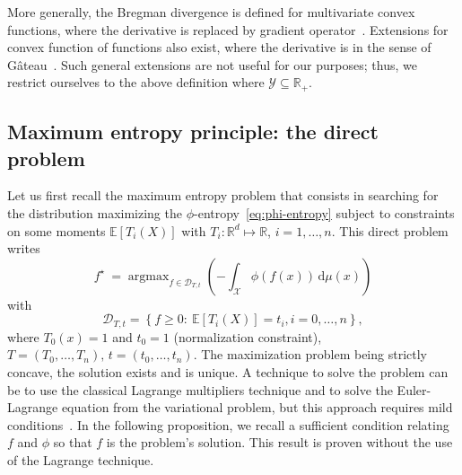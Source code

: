 \documentclass[entropy,article,submit,moreauthors,pdftex]{Definitions/mdpi}
\def\dmu{\mathrm{d}\mu}%
\def\Rset{\mathbb{R}}%
\def\X{\mathcal{X}}%
\def\Y{\mathcal{Y}}%
\def\D{\mathcal{D}}%
\DeclareMathOperator*{\argmax}{\operatorname{argmax}}%
\newcommand{\Esp}[1]{\mathbb{E}\left[ #1 \right]}%
\begin{document}
More  generally,  the Bregman  divergence  is  defined for  multivariate  convex
functions,     where    the     derivative    is     replaced    by     gradient
operator~\cite{Bre67}. Extensions  for convex function of  functions also exist,
where the derivative  is in the sense of  G\^ateau~\cite{NieNoc17}. Such general
extensions are not  useful for our purposes; thus, we  restrict ourselves to the
above definition where $\Y \subseteq \Rset_+$.




\subsection{Maximum entropy principle: the direct problem}
\label{subsec:MaxPhiEntDirect}

Let us first  recall the maximum entropy problem that  consists in searching for
the distribution maximizing the $\phi$-entropy~\eqref{eq:phi-entropy} subject to
constraints on  some moments $\Esp{T_i(X)}$  with $T_i: \Rset^d  \mapsto \Rset$,
$i=1,\ldots,n$. This direct problem writes
%
\begin{equation}\label{eq:MaxEnt}
\displaystyle f^\star \: = \argmax_{f  \in \D_{T,t}} \left( - \int_\X \phi(f(x))
\, \dmu(x) \right)
\end{equation}
%
with
%
\begin{equation}\label{eq:Ct}
\D_{T,t} = \left\{ f \ge 0: \: \Esp{T_i(X)} = t_i, i=0,\ldots,n\right\},
\end{equation}
%
where $T_0(x) = 1$ and $t_0 =  1$ (normalization constraint), $T = (T_0 , \ldots
, T_n), \, t  = (t_0 , \ldots , t_n)$.  The  maximization problem being strictly
concave, the solution exists and is unique. A technique to solve the problem can
be  to  use the  classical  Lagrange  multipliers  technique  and to  solve  the
Euler-Lagrange equation from the variational problem, but this approach requires
mild  conditions~\cite{KesKap89,  BorLew91:03,   BorLew93,  BenBor92,  TebVaj93,
  Gir97}.   In  the following  proposition,  we  recall a  sufficient  condition
relating $f$ and  $\phi$ so that $f$  is the problem's solution.  This result is
proven without the use of the Lagrange technique.
\end{document}
